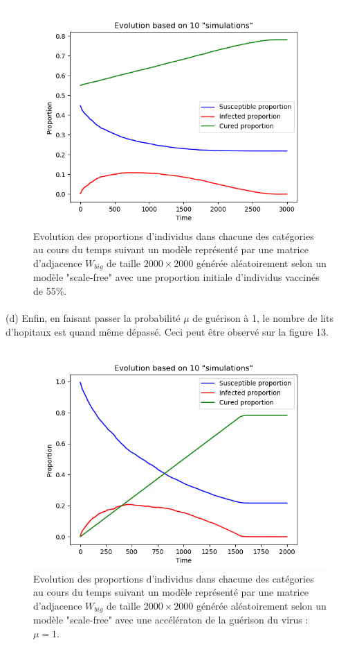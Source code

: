 \documentclass[a4paper, 12pt, oneside]{article}
\begin{document}
\begin{figure}[H]
	\centering
	\includegraphics[scale=1]{Wbig_dense_initial_immunised_comparaison.png} 
	\caption{Evolution des proportions d'individus dans chacune des catégories au cours du temps suivant un modèle représenté par une matrice d'adjacence $W_{big}$ de taille $2000 \times 2000$ générée aléatoirement selon un modèle "scale-free" avec une proportion initiale d'individus vaccinés de 55\%.}
\end{figure}

\paragraph{}(d) Enfin, en faisant passer la probabilité $\mu$ de guérison à 1, le nombre de lits d'hopitaux est quand même dépassé. Ceci peut être observé sur la figure 13.

\begin{figure}[H]
	\centering
	\includegraphics[scale=1]{Wbig_dense_speeded_heal_comparaison.png} 
	\caption{Evolution des proportions d'individus dans chacune des catégories au cours du temps suivant un modèle représenté par une matrice d'adjacence $W_{big}$ de taille $2000 \times 2000$ générée aléatoirement selon un modèle "scale-free" avec une accélératon de la guérison du virus : $\mu = 1$.}
\end{figure}
\end{document}
